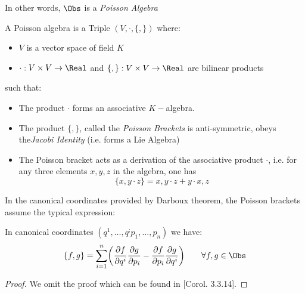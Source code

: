 \documentclass[Main]{subfiles}
\begin{document}
	In other words, $\Obs$ is a \emph{Poisson Algebra}
	\begin{definition}
A Poisson algebra is a Triple $\left(V, \cdot ,\{ , \} \right)$  where:
\begin{itemize}
	\item $V$ is a vector space of field $K$
	\item $ \cdot : V \times V \rightarrow \Real$  and $\{ , \} : V \times V \rightarrow \Real$ are bilinear products
\end{itemize}
such that:
\begin{itemize}
\item The product $ \cdot $ forms an  associative $K-$algebra.
\item The product $\{ , \}$, called the \emph{Poisson Brackets}  is anti-symmetric, obeys the\emph{Jacobi Identity} (i.e. forms a Lie Algebra)
\item The Poisson bracket acts as a derivation of the associative product $ \cdot $, i.e. for any three elements $x,y,z$ in the algebra, one has
\begin{displaymath}
	\{x, y \cdot z \} = { x , y } \cdot z + y \cdot { x , z }
\end{displaymath}
\end{itemize}
\end{definition}
	
	\vspace{2mm}
	In the canonical coordinates provided  by  Darboux theorem, the  Poisson brackets assume the typical expression:
	\begin{proposition}
	
	In canonical coordinates  $(q^1, \ldots, q^; p_1, \ldots, p_n)$ we have:
	\begin{equation}\label{Eq:SymplecticCoordinateRepresentation}
		\{f,g\} = \sum_{i=1}^n \biggr(\frac{\partial f}{\partial q^i} \frac{\partial g}{\partial p_i}  - \frac{\partial f}{\partial p_i} \frac{\partial g}{\partial q^i} \biggr) \qquad \forall f,g \in \Obs
	\end{equation}
	\end{proposition}
	\begin{proof}
			We omit the proof which can be found in \cite{Abraham1978}[Corol. 3.3.14].
	\end{proof}
\end{document}
